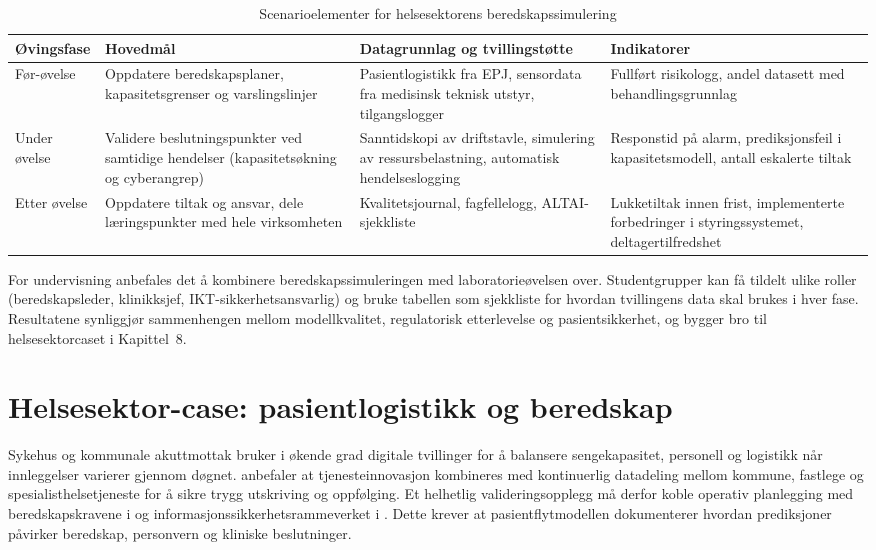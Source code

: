 \begin{table}[ht]
    \centering
    \caption{Scenarioelementer for helsesektorens beredskapssimulering}
    \label{tab:helseberedskap}
    \begin{tabular}{|p{3.0cm}|p{4.6cm}|p{4.6cm}|p{3.0cm}|}
        \hline
        \textbf{Øvingsfase} & \textbf{Hovedmål} & \textbf{Datagrunnlag og tvillingstøtte} & \textbf{Indikatorer} \\
        \hline
        Før-øvelse & Oppdatere beredskapsplaner, kapasitetsgrenser og varslingslinjer & Pasientlogistikk fra EPJ, sensordata fra medisinsk teknisk utstyr, tilgangslogger & Fullført risikologg, andel datasett med behandlingsgrunnlag \\
        \hline
        Under øvelse & Validere beslutningspunkter ved samtidige hendelser (kapasitetsøkning og cyberangrep) & Sanntidskopi av driftstavle, simulering av ressursbelastning, automatisk hendelseslogging & Responstid på alarm, prediksjonsfeil i kapasitetsmodell, antall eskalerte tiltak \\
        \hline
        Etter øvelse & Oppdatere tiltak og ansvar, dele læringspunkter med hele virksomheten & Kvalitetsjournal, fagfellelogg, ALTAI-sjekkliste & Lukketiltak innen frist, implementerte forbedringer i styringssystemet, deltagertilfredshet \\
        \hline
    \end{tabular}
\end{table}

For undervisning anbefales det å kombinere beredskapssimuleringen med laboratorieøvelsen over. Studentgrupper kan få tildelt ulike roller (beredskapsleder, klinikksjef, IKT-sikkerhetsansvarlig) og bruke tabellen som sjekkliste for hvordan tvillingens data skal brukes i hver fase. Resultatene synliggjør sammenhengen mellom modellkvalitet, regulatorisk etterlevelse og pasientsikkerhet, og bygger bro til helsesektorcaset i Kapittel~8.

\section{Helsesektor-case: pasientlogistikk og beredskap}
Sykehus og kommunale akuttmottak bruker i økende grad digitale tvillinger for å balansere sengekapasitet, personell og logistikk når innleggelser varierer gjennom døgnet. \citet{helsedir2020dho} anbefaler at tjenesteinnovasjon kombineres med kontinuerlig datadeling mellom kommune, fastlege og spesialisthelsetjeneste for å sikre trygg utskriving og oppfølging. Et helhetlig valideringsopplegg må derfor koble operativ planlegging med beredskapskravene i \citet{hod2020beredskap} og informasjonssikkerhetsrammeverket i \citet{norm2023}. Dette krever at pasientflytmodellen dokumenterer hvordan prediksjoner påvirker beredskap, personvern og kliniske beslutninger.

